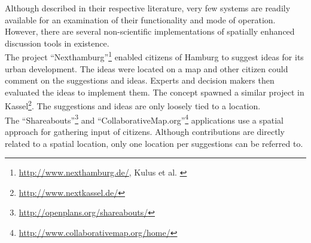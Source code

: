 Although described in their respective literature, very few systems are readily available for an examination of their functionality and mode of operation. However, there are several non-scientific implementations of spatially enhanced discussion tools in existence.\\
The project ``Nexthamburg''\footnote{\url{http://www.nexthamburg.de/}, Kulus et al. \cite{Kulus_nexthamburg}} enabled citizens of Hamburg to suggest ideas for its urban development. The ideas were located on a map and other citizen could comment on the suggestions and ideas. Experts and decision makers then evaluated the ideas to implement them. The concept spawned a similar project in Kassel\footnote{\url{http://www.nextkassel.de/}}. The suggestions and ideas are only loosely tied to a location.\\
The ``Shareabouts''\footnote{\url{http://openplans.org/shareabouts/}} and ``CollaborativeMap.org''\footnote{\url{http://www.collaborativemap.org/home/}} applications use a spatial approach for gathering input of citizens. Although contributions are directly related to a spatial location, only one location per suggestions can be referred to.



 
